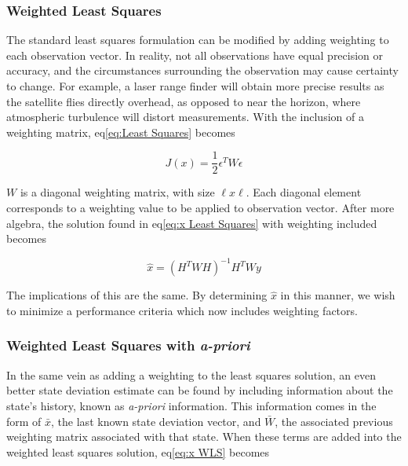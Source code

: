 \documentclass[12pt,a4paper,oneside]{article}
\numberwithin{equation}{section}   		%
\begin{document}
\subsubsection{Weighted Least Squares}
\label{OD sub WLS}
The standard least squares formulation can be modified by adding weighting to each observation vector. In reality, not all observations have equal precision or accuracy, and the circumstances surrounding the observation may cause certainty to change. For example, a laser range finder will obtain more precise results as the satellite flies directly overhead, as opposed to near the horizon, where atmospheric turbulence will distort measurements. With the inclusion of a weighting matrix, eq\eqref{eq:Least Squares} becomes

\begin{equation}
	J(x) = \frac{1}{2}\epsilon^T W \epsilon
	\label{eq: J WLS}
\end{equation}

$W$ is a diagonal weighting matrix, with size $\ell x \ell$. Each diagonal element corresponds to a weighting value to be applied to observation vector. After more algebra, the solution found in eq\eqref{eq:x Least Squares} with weighting included becomes

\begin{equation}
	\hat{x} = (H^TW  H)^{-1} H^T W y
	\label{eq:x WLS}
\end{equation}

The implications of this are the same. By determining $\hat{x}$ in this manner, we wish to minimize a performance criteria which now includes weighting factors.


\subsubsection{Weighted Least Squares with \emph{a-priori}}
\label{OD sub WLSap}
In the same vein as adding a weighting to the least squares solution, an even better state deviation estimate can be found by including information about the state's history, known as \emph{a-priori} information. This information comes in the form of $\bar{x}$, the last known state deviation vector, and $\bar{W}$, the associated previous weighting matrix associated with that state. When these terms are added into the weighted least squares solution, eq\eqref{eq:x WLS} becomes
\end{document}
